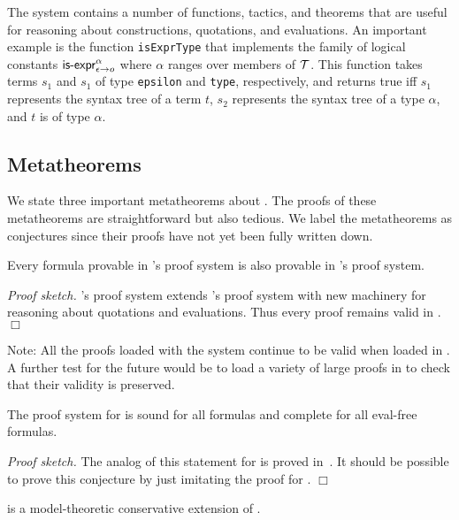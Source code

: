 \documentclass[fleqn]{llncs}
\begin{document}
The {\HLQE} system contains a number of {\HOL} functions, tactics, and
theorems that are useful for reasoning about constructions,
quotations, and evaluations.  An important example is the {\HOL}
function \texttt{isExprType} that implements the {\churchqe} family of
logical constants $\mbox{\sf is-expr}_{\epsilon \rightarrow o}^{\alpha}$
where $\alpha$ ranges over members of $\mbox{$\cal T$}$.  This function takes
terms $s_1$ and $s_1$ of type \texttt{epsilon} and \texttt{type},
respectively, and returns true iff $s_1$ represents the syntax tree of
a term $t$, $s_2$ represents the syntax tree of a type $\alpha$, and
$t$ is of type $\alpha$.

\subsection{Metatheorems}

We state three important metatheorems about {\HLQE}.  The proofs of
these metatheorems are straightforward but also tedious.  We label the
metatheorems as conjectures since their proofs have not yet been fully
written down.

\begin{conjecture}\bsp
Every formula provable in {\HL}'s proof system is also provable in
{\HLQE}'s proof system.\esp
\end{conjecture}

\noindent
\emph{Proof sketch.}  {\HLQE}'s proof system extends {\HL}'s proof
system with new machinery for reasoning about quotations and
evaluations. Thus every {\HL} proof remains valid in {\HLQE}. \hfill
$\Box$

\bigskip

\noindent
Note: All the proofs loaded with the {\HL} system continue to be valid
when loaded in {\HLQE}.  A further test for the future would be to
load a variety of large {\HL} proofs in {\HLQE} to check that their
validity is preserved.

\begin{conjecture}
The proof system for {\HLQE} is sound for all formulas and complete
for all eval-free formulas.
\end{conjecture}

\noindent
\emph{Proof sketch.}  The analog of this statement for {\churchqe} is
proved in~\cite{Farmer18}.  It should be possible to prove this
conjecture by just imitating the proof for {\churchqe}.  \hfill $\Box$

\begin{conjecture}\bsp
{\HLQE} is a model-theoretic conservative extension of {\HL}.\esp
\end{conjecture}
\end{document}
